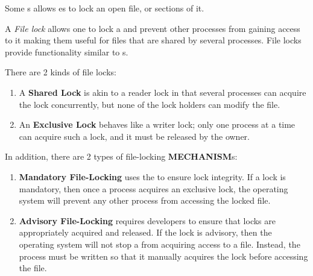 Some s allows es to lock an open file, or sections of it.
\begin{definition}\label{def:File_Lock}
  A \emph{File lock} allows one  to lock a  and prevent other processes from gaining access to it making them useful for files that are shared by several processes.
  File locks provide functionality similar to s.

  There are 2 kinds of file locks:
  \begin{enumerate}[noitemsep]
  \item A \textbf{Shared Lock} is akin to a reader lock in that several processes can acquire the lock concurrently, but none of the lock holders can modify the file.
  \item An \textbf{Exclusive Lock} behaves like a writer lock; only one process at a time can acquire such a lock, and it must be released by the owner.
  \end{enumerate}

  In addition, there are 2 types of file-locking \textbf{MECHANISM}s:
  \begin{enumerate}[noitemsep]
  \item \textbf{Mandatory File-Locking} uses the  to ensure lock integrity.
    If a lock is mandatory, then once a process acquires an exclusive lock, the operating system will prevent any other process from accessing the locked file.
  \item \textbf{Advisory File-Locking} requires developers to ensure that locks are appropriately acquired and released.
    If the lock is advisory, then the operating system will not stop a  from acquiring access to a file.
    Instead, the process must be written so that it manually acquires the lock before accessing the file.
  \end{enumerate}

\end{definition}

